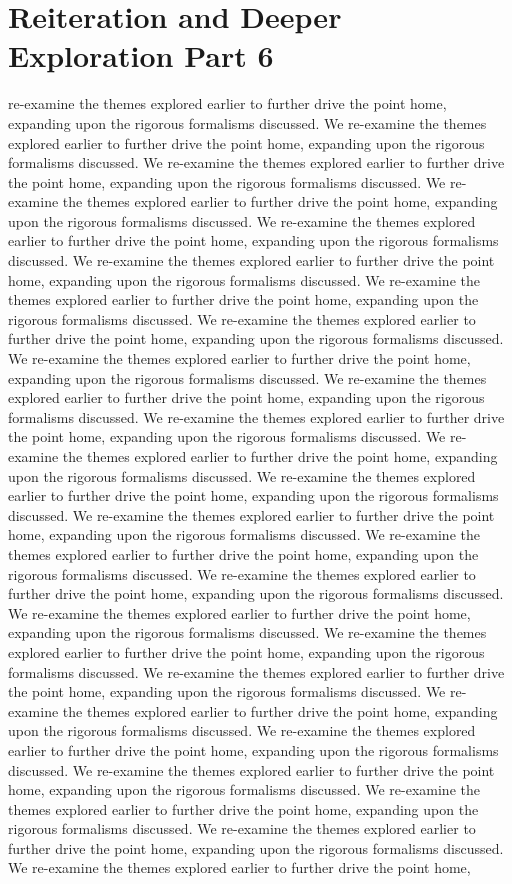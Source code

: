 \section{Reiteration and Deeper Exploration Part 6}\nWe re-examine the themes explored earlier to further drive the point home, expanding upon the rigorous formalisms discussed. We re-examine the themes explored earlier to further drive the point home, expanding upon the rigorous formalisms discussed. We re-examine the themes explored earlier to further drive the point home, expanding upon the rigorous formalisms discussed. We re-examine the themes explored earlier to further drive the point home, expanding upon the rigorous formalisms discussed. We re-examine the themes explored earlier to further drive the point home, expanding upon the rigorous formalisms discussed. We re-examine the themes explored earlier to further drive the point home, expanding upon the rigorous formalisms discussed. We re-examine the themes explored earlier to further drive the point home, expanding upon the rigorous formalisms discussed. We re-examine the themes explored earlier to further drive the point home, expanding upon the rigorous formalisms discussed. We re-examine the themes explored earlier to further drive the point home, expanding upon the rigorous formalisms discussed. We re-examine the themes explored earlier to further drive the point home, expanding upon the rigorous formalisms discussed. We re-examine the themes explored earlier to further drive the point home, expanding upon the rigorous formalisms discussed. We re-examine the themes explored earlier to further drive the point home, expanding upon the rigorous formalisms discussed. We re-examine the themes explored earlier to further drive the point home, expanding upon the rigorous formalisms discussed. We re-examine the themes explored earlier to further drive the point home, expanding upon the rigorous formalisms discussed. We re-examine the themes explored earlier to further drive the point home, expanding upon the rigorous formalisms discussed. We re-examine the themes explored earlier to further drive the point home, expanding upon the rigorous formalisms discussed. We re-examine the themes explored earlier to further drive the point home, expanding upon the rigorous formalisms discussed. We re-examine the themes explored earlier to further drive the point home, expanding upon the rigorous formalisms discussed. We re-examine the themes explored earlier to further drive the point home, expanding upon the rigorous formalisms discussed. We re-examine the themes explored earlier to further drive the point home, expanding upon the rigorous formalisms discussed. We re-examine the themes explored earlier to further drive the point home, expanding upon the rigorous formalisms discussed. We re-examine the themes explored earlier to further drive the point home, expanding upon the rigorous formalisms discussed. We re-examine the themes explored earlier to further drive the point home, expanding upon the rigorous formalisms discussed. We re-examine the themes explored earlier to further drive the point home, expanding upon the rigorous formalisms discussed. We re-examine the themes explored earlier to further drive the point home, 